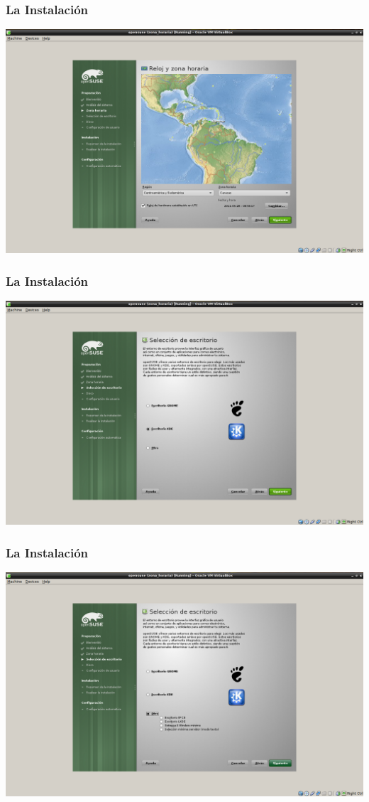 \documentclass{beamer}
\begin{document}
\begin{frame}
\frametitle{La Instalaci\'on}
\includegraphics[height=0.8\textheight]{2.png} \hspace*{7.3cm}
\end{frame} 
\begin{frame}
\frametitle{La Instalaci\'on}
\includegraphics[height=0.8\textheight]{3_.png} \hspace*{7.3cm}
\end{frame} 
\begin{frame}
\frametitle{La Instalaci\'on}
\includegraphics[height=0.8\textheight]{4_.png} \hspace*{7.3cm}
\end{frame} 
\end{document}
